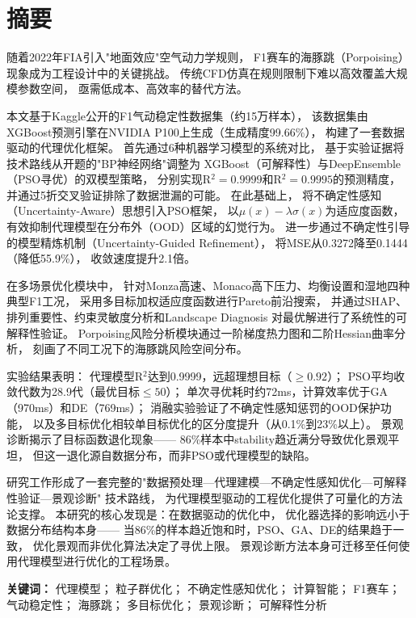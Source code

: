 \section*{摘要}

随着2022年FIA引入"地面效应"空气动力学规则，
F1赛车的海豚跳（Porpoising）现象成为工程设计中的关键挑战。
传统CFD仿真在规则限制下难以高效覆盖大规模参数空间，
亟需低成本、高效率的替代方法。

本文基于Kaggle公开的F1气动稳定性数据集（约15万样本），
该数据集由XGBoost预测引擎在NVIDIA P100上生成（生成精度99.66\%），
构建了一套数据驱动的代理优化框架。
首先通过6种机器学习模型的系统对比，
基于实验证据将技术路线从开题的"BP神经网络"调整为
XGBoost（可解释性）与DeepEnsemble（PSO寻优）的双模型策略，
分别实现R$^2 = 0.9999$和R$^2 = 0.9995$的预测精度，
并通过5折交叉验证排除了数据泄漏的可能。
在此基础上，
将不确定性感知（Uncertainty-Aware）思想引入PSO框架，
以$\mu(x)-\lambda\sigma(x)$为适应度函数，
有效抑制代理模型在分布外（OOD）区域的幻觉行为。
进一步通过不确定性引导的模型精炼机制（Uncertainty-Guided Refinement），
将MSE从0.3272降至0.1444（降低55.9\%），
收敛速度提升2.1倍。

在多场景优化模块中，
针对Monza高速、Monaco高下压力、均衡设置和湿地四种典型F1工况，
采用多目标加权适应度函数进行Pareto前沿搜索，
并通过SHAP、排列重要性、约束灵敏度分析和Landscape Diagnosis
对最优解进行了系统性的可解释性验证。
Porpoising风险分析模块通过一阶梯度热力图和二阶Hessian曲率分析，
刻画了不同工况下的海豚跳风险空间分布。

实验结果表明：
代理模型R$^2$达到0.9999，远超理想目标（$\geq 0.92$）；
PSO平均收敛代数为28.9代（最优目标$\leq 50$）；
单次寻优耗时约72ms，计算效率优于GA（970ms）和DE（769ms）；
消融实验验证了不确定性感知惩罚的OOD保护功能，
以及多目标优化相较单目标优化的区分度提升（从0.1\%到23\%以上）。
景观诊断揭示了目标函数退化现象——
86\%样本中stability趋近满分导致优化景观平坦，
但这一退化源自数据分布，而非PSO或代理模型的缺陷。

研究工作形成了一套完整的"数据预处理—代理建模—不确定性感知优化—可解释性验证—景观诊断"
技术路线，
为代理模型驱动的工程优化提供了可量化的方法论支撑。
本研究的核心发现是：在数据驱动的优化中，
优化器选择的影响远小于数据分布结构本身——
当86\%的样本趋近饱和时，PSO、GA、DE的结果趋于一致，
优化景观而非优化算法决定了寻优上限。
景观诊断方法本身可迁移至任何使用代理模型进行优化的工程场景。

\vspace{0.5cm}

\noindent
\textbf{关键词：}
代理模型；
粒子群优化；
不确定性感知优化；
计算智能；
F1赛车；
气动稳定性；
海豚跳；
多目标优化；
景观诊断；
可解释性分析
